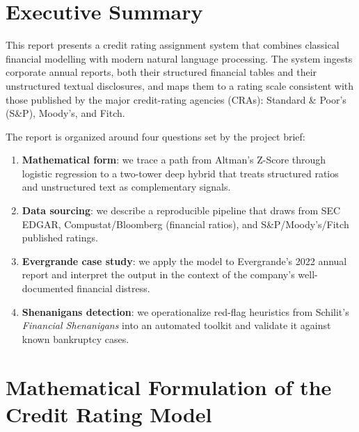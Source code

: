 \documentclass[12pt, a4paper]{article}
\begin{document}
\tableofcontents
\newpage

\section*{Executive Summary}

This report presents a credit rating assignment system that combines classical financial modelling with modern natural language processing.  The system ingests corporate annual reports, both their structured financial tables and their unstructured textual disclosures, and maps them to a rating scale consistent with those published by the major credit-rating agencies (CRAs): Standard \& Poor's (S\&P), Moody's, and Fitch.

The report is organized around four questions set by the project brief:

\begin{enumerate}[label=\textbf{(\alph*)}, leftmargin=2em]
  \item \textbf{Mathematical form}: we trace a path from Altman's Z-Score through logistic regression to a two-tower deep hybrid that treats structured ratios and unstructured text as complementary signals.
  \item \textbf{Data sourcing}: we describe a reproducible pipeline that draws from SEC EDGAR, Compustat/Bloomberg (financial ratios), and S\&P/Moody's/Fitch published ratings.
  \item \textbf{Evergrande case study}: we apply the model to Evergrande's 2022 annual report and interpret the output in the context of the company's well-documented financial distress.
  \item \textbf{Shenanigans detection}: we operationalize red-flag heuristics from Schilit's \textit{Financial Shenanigans} into an automated toolkit and validate it against known bankruptcy cases.
\end{enumerate}

\newpage

\section{Mathematical Formulation of the Credit Rating Model}
\label{sec:model}
\end{document}
